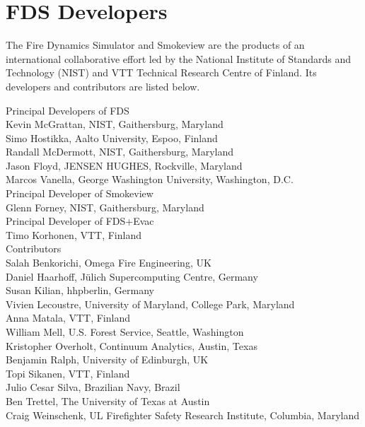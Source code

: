\chapter{FDS Developers}

The Fire Dynamics Simulator and Smokeview are the products of an international collaborative effort led by
the National Institute of Standards and Technology (NIST) and VTT Technical Research Centre of Finland. Its developers and
contributors are listed below.

\vspace{0.3in}

\begin{flushleft}

Principal Developers of FDS  \\ [0.2in]

Kevin McGrattan, NIST, Gaithersburg, Maryland \\
Simo Hostikka, Aalto University, Espoo, Finland \\
Randall McDermott, NIST, Gaithersburg, Maryland \\
Jason Floyd, JENSEN HUGHES, Rockville, Maryland \\
Marcos Vanella, George Washington University, Washington, D.C. \\ [0.3in]

Principal Developer of Smokeview  \\ [0.2in]

Glenn Forney, NIST, Gaithersburg, Maryland \\ [0.3in]

Principal Developer of FDS+Evac  \\ [0.2in]

Timo Korhonen, VTT, Finland \\ [0.3in]

Contributors \\ [0.2in]

Salah Benkorichi, Omega Fire Engineering, UK \\
Daniel Haarhoff, J\"ulich Supercomputing Centre, Germany \\
Susan Kilian, hhpberlin, Germany \\
Vivien Lecoustre, University of Maryland, College Park, Maryland \\
Anna Matala, VTT, Finland \\
William Mell, U.S. Forest Service, Seattle, Washington \\
Kristopher Overholt, Continuum Analytics, Austin, Texas \\
Benjamin Ralph, University of Edinburgh, UK \\
Topi Sikanen, VTT, Finland \\
Julio Cesar Silva, Brazilian Navy, Brazil \\
Ben Trettel, The University of Texas at Austin \\
Craig Weinschenk, UL Firefighter Safety Research Institute, Columbia, Maryland

\end{flushleft}


